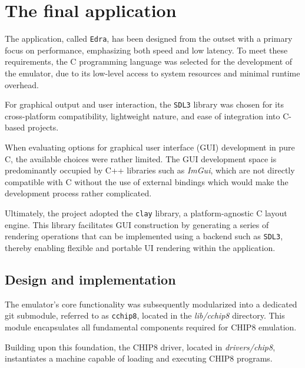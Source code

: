 \chapter{The final application}
\label{chap:ch4}

\par The application, called \texttt{Edra\cite{GithubEdra}}, has been designed from the outset with a primary focus on performance, emphasizing both speed and low latency. To meet these requirements, the C programming language was selected for the development of the emulator, due to its low-level access to system resources and minimal runtime overhead.

\par For graphical output and user interaction, the \texttt{SDL3\cite{GithubSDL3}} library was chosen for its cross-platform compatibility, lightweight nature, and ease of integration into C-based projects.

\par When evaluating options for graphical user interface (GUI) development in pure C, the available choices were rather limited. The GUI development space is predominantly occupied by C++ libraries such as \textit{ImGui\cite{GithubIMGUI}}, which are not directly compatible with C without the use of external bindings which would make the development process rather complicated.

\par Ultimately, the project adopted the \texttt{clay\cite{GithubCLAY}} library, a platform-agnostic C layout engine. This library facilitates GUI construction by generating a series of rendering operations that can be implemented using a backend such as \texttt{SDL3\cite{GithubSDL3}}, thereby enabling flexible and portable UI rendering within the application.

\section{Design and implementation}
\label{sec:ch4sec1}

\par The emulator's core functionality was subsequently modularized into a dedicated git submodule, referred to as \texttt{cchip8\cite{GithubCCHIP8}}, located in the \textit{lib/cchip8} directory. This module encapsulates all fundamental components required for CHIP8 emulation.

\par Building upon this foundation, the CHIP8 driver, located in \textit{drivers/chip8}, instantiates a machine capable of loading and executing CHIP8 programs.

